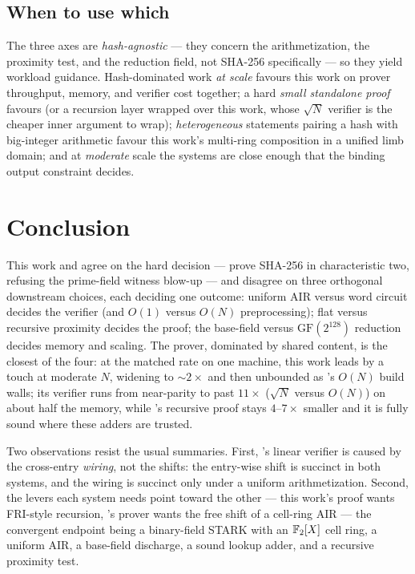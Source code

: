 \subsection{When to use which}
\label{sec:guidance-brief}

The three axes are \emph{hash-agnostic} --- they concern the arithmetization, the
proximity test, and the reduction field, not SHA-256 specifically --- so they
yield workload guidance. Hash-dominated work \emph{at scale} favours this work on
prover throughput, memory, and verifier cost together; a hard \emph{small
standalone proof} favours \binius{} (or a recursion layer wrapped over this work,
whose $\sqrt N$ verifier is the cheaper inner argument to wrap); \emph{heterogeneous}
statements pairing a hash with big-integer arithmetic favour this work's
multi-ring composition in a unified limb domain; and at \emph{moderate} scale the
systems are close enough that the binding output constraint decides.

\section{Conclusion}
\label{sec:conclusion}

This work and \binius{} agree on the hard decision --- prove SHA-256 in
characteristic two, refusing the prime-field witness blow-up --- and disagree on
three orthogonal downstream choices, each deciding one outcome: uniform AIR
versus word circuit decides the verifier (and $O(1)$ versus $O(N)$
preprocessing); flat versus recursive proximity decides the proof; the
base-field versus $\mathrm{GF}(2^{128})$ reduction decides memory and scaling.
The prover, dominated by shared content, is the closest of the four: at the
matched rate on one machine, this work leads by a touch at moderate $N$, widening
to $\sim$$2\times$ and then unbounded as \binius{}'s $O(N)$ build walls; its
verifier runs from near-parity to past $11\times$ ($\sqrt N$ versus $O(N)$) on
about half the memory, while \binius{}'s recursive proof stays $4$--$7\times$
smaller and it is fully sound where these adders are trusted.

Two observations resist the usual summaries. First, \binius{}'s linear verifier
is caused by the cross-entry \emph{wiring}, not the shifts: the entry-wise shift
is succinct in both systems, and the wiring is succinct only under a uniform
arithmetization. Second, the levers each system needs point toward the other ---
this work's proof wants FRI-style recursion, \binius{}'s prover wants the free
shift of a cell-ring AIR --- the convergent endpoint being a binary-field STARK
with an $\mathbb{F}_2[X]$ cell ring, a uniform AIR, a base-field discharge, a sound
lookup adder, and a recursive proximity test.
